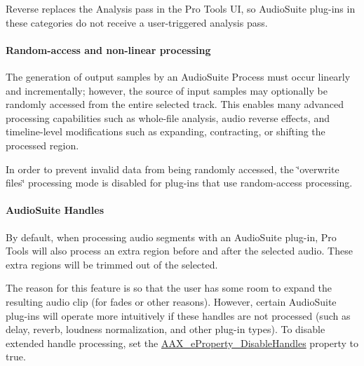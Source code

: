 Reverse replaces the Analysis pass in the Pro Tools UI, so Audio\+Suite plug-\/ins in these categories do not receive a user-\/triggered analysis pass.

\hypertarget{a00830_subsubsection__random-access_and_non-linear_processing_}{}\paragraph{Random-\/access and non-\/linear processing}\label{a00830_subsubsection__random-access_and_non-linear_processing_}
 The generation of output samples by an Audio\+Suite Process must occur linearly and incrementally; however, the source of input samples may optionally be randomly accessed from the entire selected track. This enables many advanced processing capabilities such as whole-\/file analysis, audio reverse effects, and timeline-\/level modifications such as expanding, contracting, or shifting the processed region.

In order to prevent invalid data from being randomly accessed, the \char`\"{}overwrite files\char`\"{} processing mode is disabled for plug-\/ins that use random-\/access processing.

\hypertarget{a00830_subsubsection__audiosuite_handles_}{}\paragraph{Audio\+Suite Handles}\label{a00830_subsubsection__audiosuite_handles_}
 By default, when processing audio segments with an Audio\+Suite plug-\/in, Pro Tools will also process an extra region before and after the selected audio. These extra regions will be trimmed out of the selected.



The reason for this feature is so that the user has some room to expand the resulting audio clip (for fades or other reasons). However, certain Audio\+Suite plug-\/ins will operate more intuitively if these handles are not processed (such as delay, reverb, loudness normalization, and other plug-\/in types). To disable extended handle processing, set the \mbox{\hyperlink{a00662_a13e384f22825afd3db6d68395b79ce0da943c37cd8a41a4d271dd28c89b518044}{A\+A\+X\+\_\+e\+Property\+\_\+\+Disable\+Handles}} property to true.



